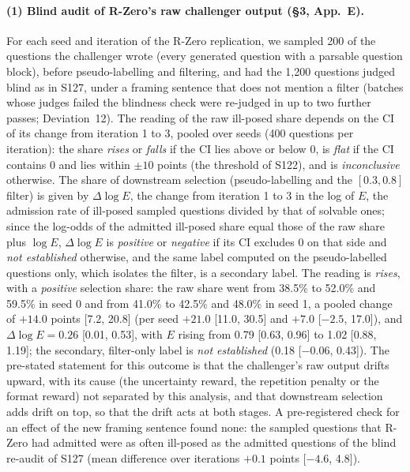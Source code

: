 \documentclass[10pt,a4paper]{article}
\begin{document}
\paragraph{(1) Blind audit of R-Zero's raw challenger output (\S3, App.~E).} For each seed and iteration of the R-Zero replication, we sampled 200 of the questions the challenger wrote (every generated question with a parsable question block), before pseudo-labelling and filtering, and had the 1,200 questions judged blind as in S127, under a framing sentence that does not mention a filter (batches whose judges failed the blindness check were re-judged in up to two further passes; Deviation~12). The reading of the raw ill-posed share depends on the CI of its change from iteration 1 to 3, pooled over seeds (400 questions per iteration): the share \emph{rises} or \emph{falls} if the CI lies above or below 0, is \emph{flat} if the CI contains 0 and lies within $\pm 10$ points (the threshold of S122), and is \emph{inconclusive} otherwise. The share of downstream selection (pseudo-labelling and the $[0.3, 0.8]$ filter) is given by $\Delta \log E$, the change from iteration 1 to 3 in the log of $E$, the admission rate of ill-posed sampled questions divided by that of solvable ones; since the log-odds of the admitted ill-posed share equal those of the raw share plus $\log E$, $\Delta \log E$ is \emph{positive} or \emph{negative} if its CI excludes 0 on that side and \emph{not established} otherwise, and the same label computed on the pseudo-labelled questions only, which isolates the filter, is a secondary label. The reading is \emph{rises}, with a \emph{positive} selection share: the raw share went from 38.5\% to 52.0\% and 59.5\% in seed 0 and from 41.0\% to 42.5\% and 48.0\% in seed 1, a pooled change of $+14.0$ points [7.2, 20.8] (per seed $+21.0$ [11.0, 30.5] and $+7.0$ [$-2.5$, 17.0]), and $\Delta \log E = 0.26$ [0.01, 0.53], with $E$ rising from 0.79 [0.63, 0.96] to 1.02 [0.88, 1.19]; the secondary, filter-only label is \emph{not established} (0.18 [$-0.06$, 0.43]). The pre-stated statement for this outcome is that the challenger's raw output drifts upward, with its cause (the uncertainty reward, the repetition penalty or the format reward) not separated by this analysis, and that downstream selection adds drift on top, so that the drift acts at both stages. A pre-registered check for an effect of the new framing sentence found none: the sampled questions that R-Zero had admitted were as often ill-posed as the admitted questions of the blind re-audit of S127 (mean difference over iterations $+0.1$ points [$-4.6$, 4.8]).
\end{document}
